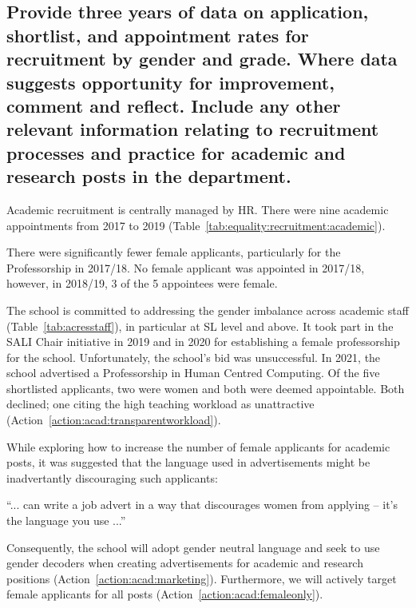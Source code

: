 





\subsection{Provide three years of data on application, shortlist, and appointment rates for recruitment by gender and grade. Where data suggests opportunity for improvement, comment and reflect. Include any other relevant information relating to recruitment processes and practice for academic and research posts in the department. }

Academic recruitment is centrally managed by \ac{HR}. There were nine academic appointments from 2017 to 2019 (Table~\ref{tab:equality:recruitment:academic}).

There were significantly fewer female applicants, particularly for the Professorship in 2017/18. 
No female applicant was appointed in 2017/18, however, in 2018/19,  3 of the 5 appointees were female. 



The school is committed to addressing the gender imbalance across academic staff (Table~\ref{tab:acresstaff}), in particular at \ac{SL} level and above.
It took part in the \ac{SALI} Chair initiative in 2019 and in 2020 for establishing a female professorship for the school. Unfortunately, the school's bid was unsuccessful. In 2021, the school advertised a Professorship in Human Centred Computing. Of the five shortlisted applicants, two were women and both were deemed appointable. Both declined; one citing the high teaching workload as unattractive (Action~\ref{action:acad:transparentworkload}).

While exploring how to increase the number of female applicants for academic posts, it was suggested that the language used in advertisements might be inadvertantly discouraging such applicants:

\begin{myquote}
``... can write a job advert in a way that discourages women from applying – it's the language you use ...''
\end{myquote}

Consequently, the school will adopt gender neutral language and seek to use gender decoders when creating advertisements for academic and research positions (Action~\ref{action:acad:marketing}). Furthermore,  we will actively target female applicants for all posts (Action~\ref{action:acad:femaleonly}).


